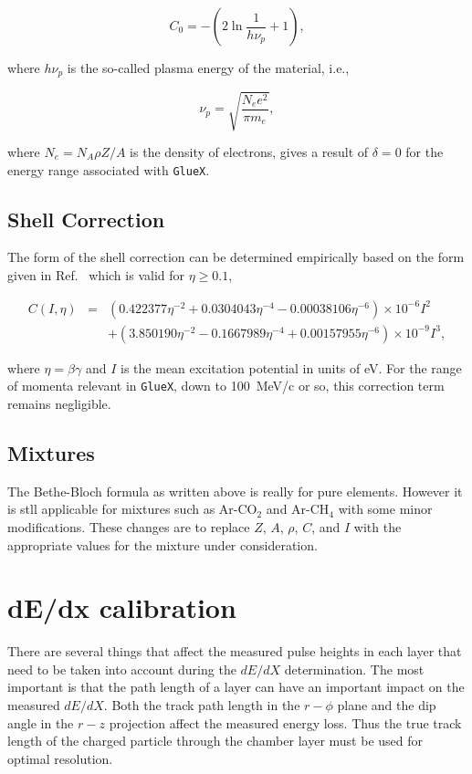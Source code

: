 \documentclass[12pt]{article}
\begin{document}
\begin{equation}
C_0 = -\left( 2 \ln \frac{1}{h \nu_p} + 1 \right),
\end{equation}

\noindent
where $h\nu_p$ is the so-called plasma energy of the material, i.e.,

\begin{equation}
\nu_p = \sqrt{\frac{N_e e^2}{\pi m_e}},
\end{equation}

\noindent
where $N_e = N_A \rho Z/A$ is the density of electrons, gives a result of $\delta=0$ for the energy range associated with {\tt GlueX}.

\subsection{Shell Correction}

The form of the shell correction can be determined empirically based on the form given in Ref.~\cite{leo} which is valid for $\eta \ge 0.1$,

\begin{eqnarray}
C(I,\eta) &=& (0.422377 \eta^{-2} + 0.0304043 \eta^{-4} - 0.00038106 \eta^{-6})
\times 10^{-6} I^2 \\ \nonumber
&~~& + (3.850190 \eta^{-2} - 0.1667989 \eta^{-4} + 0.00157955 \eta^{-6}) \times 
10^{-9} I^3,
\end{eqnarray}

\noindent
where $\eta = \beta \gamma$ and $I$ is the mean excitation potential in units of eV.  For the range of momenta relevant in {\tt GlueX}, down to 100~MeV/c or so,
this correction term remains negligible.

\subsection{Mixtures}

The Bethe-Bloch formula as written above is really for pure elements. However it is stll applicable for mixtures such as Ar-CO$_2$ and Ar-CH$_4$ with some minor modifications.
These changes are to replace $Z$, $A$, $\rho$, $C$, and $I$ with the appropriate values for the mixture under consideration.

\section{dE/dx calibration}

There are several things that affect the measured pulse heights in each
layer that need to be taken into account during the $dE/dX$ determination.
The most important is that the path length of a layer can have an
important impact on the measured $dE/dX$.  Both the track path length
in the $r - \phi$ plane and the dip angle in the $r - z$ projection affect
the measured energy loss.  Thus the true track length of the charged
particle through the chamber layer must be used for optimal resolution.
\end{document}
